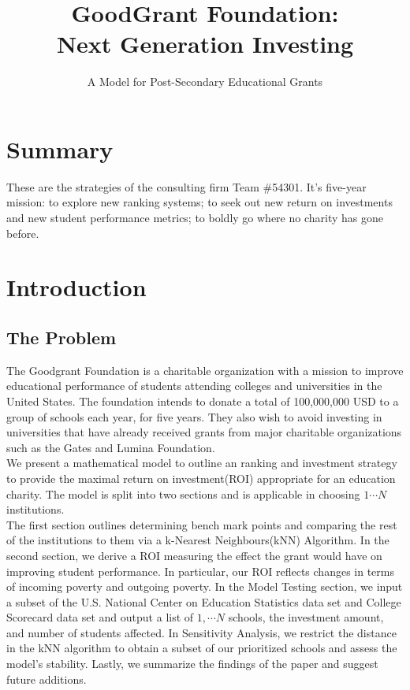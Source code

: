 \documentclass[12pt]{scrartcl}
\title{\vspace{-1.7cm} GoodGrant Foundation: \\Next Generation Investing }
\subtitle{A Model for Post-Secondary Educational Grants\vspace{-1.3cm}}
\begin{document}
\maketitle
\thispagestyle{fancy}

\section*{Summary}
These are the strategies of the consulting firm Team \#54301. It's five-year mission: to explore new ranking systems; to seek out new return on investments and new student performance metrics; to boldly go where no charity has gone before. 


\newpage
\tableofcontents
\newpage
	

\section{Introduction}
	\subsection{The Problem}
		The Goodgrant Foundation is a charitable organization with a mission to improve educational performance of students attending colleges and universities in the United States. The foundation intends to donate a total of 100,000,000 USD to a group of schools each year, for five years. They also wish to avoid investing in universities that have already received grants from major charitable organizations such as the Gates and Lumina Foundation.\\
		
		We present a mathematical model to outline an ranking and investment strategy to provide the maximal return on investment(ROI) appropriate for an education charity.  The model is split into two sections and is applicable in choosing $1\cdots N$ institutions. \\

The first section outlines determining bench mark points and comparing the rest of the institutions to them via a k-Nearest Neighbours(kNN) Algorithm. In the second section, we derive a ROI measuring the effect the grant would have on improving student performance. In particular, our ROI reflects changes in terms of incoming poverty and outgoing poverty. In the Model Testing section, we input a subset of the U.S. National Center on Education Statistics data set and College Scorecard data set and output a list of $1,\cdots{N}$ schools, the investment amount, and number of students affected. In Sensitivity Analysis, we restrict the distance in the kNN algorithm to obtain a subset of our prioritized schools and assess the model's stability. Lastly, we summarize the findings of the paper and suggest future additions. 
	
\end{document}

